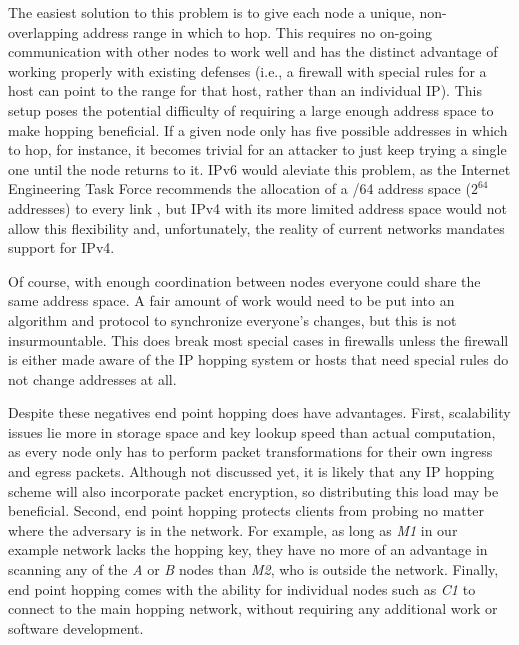 \par The easiest solution to this problem is to give each node a unique, non-overlapping address range in which to hop. This requires no on-going communication with other nodes to work well and has the distinct advantage of working properly with existing defenses (i.e., a firewall with special rules for a host can point to the range for that host, rather than an individual IP). This setup poses the potential difficulty of requiring a large enough address space to make hopping beneficial. If a given node only has five possible addresses in which to hop, for instance, it becomes trivial for an attacker to just keep trying a single one until the node returns to it. \ac{IPv6} would aleviate this problem, as the Internet Engineering Task Force recommends the allocation of a /64 address space ($2^{64}$ addresses) to every link \cite{rfc3267}, but \ac{IPv4} with its more limited address space would not allow this flexibility and, unfortunately, the reality of current networks mandates support for \ac{IPv4}. 

\par Of course, with enough coordination between nodes everyone could share the same address space. A fair amount of work would need to be put into an algorithm and protocol to synchronize everyone's changes, but this is not insurmountable. This does break most special cases in firewalls unless the firewall is either made aware of the \ac{IP} hopping system or hosts that need special rules do not change addresses at all.

\par Despite these negatives end point hopping does have advantages. First, scalability issues lie more in storage space and key lookup speed than actual computation, as every node only has to perform packet transformations for their own ingress and egress packets. Although not discussed yet, it is likely that any IP hopping scheme will also incorporate packet encryption, so distributing this load may be beneficial. Second, end point hopping protects clients from probing no matter where the adversary is in the network. For example, as long as \textit{M1} in our example network lacks the hopping key, they have no more of an advantage in scanning any of the \textit{A} or \textit{B} nodes than \textit{M2}, who is outside the network. Finally, end point hopping comes with the ability for individual nodes such as \textit{C1} to connect to the main hopping network, without requiring any additional work or software development.

